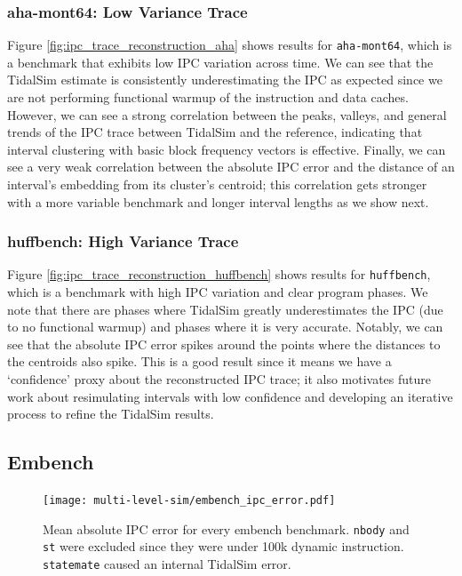 \documentclass[sigplan,nonacm,10pt]{acmart}
\begin{document}
\subsubsection{aha-mont64: Low Variance Trace}

Figure \ref{fig:ipc_trace_reconstruction_aha} shows results for \texttt{aha-mont64}, which is a benchmark that exhibits low IPC variation across time.
We can see that the TidalSim estimate is consistently underestimating the IPC as expected since we are not performing functional warmup of the instruction and data caches.
However, we can see a strong correlation between the peaks, valleys, and general trends of the IPC trace between TidalSim and the reference, indicating that interval clustering with basic block frequency vectors is effective.
Finally, we can see a very weak correlation between the absolute IPC error and the distance of an interval's embedding from its cluster's centroid; this correlation gets stronger with a more variable benchmark and longer interval lengths as we show next.

\subsubsection{huffbench: High Variance Trace}

Figure \ref{fig:ipc_trace_reconstruction_huffbench} shows results for \texttt{huffbench}, which is a benchmark with high IPC variation and clear program phases.
We note that there are phases where TidalSim greatly underestimates the IPC (due to no functional warmup) and phases where it is very accurate.
Notably, we can see that the absolute IPC error spikes around the points where the distances to the centroids also spike.
This is a good result since it means we have a `confidence' proxy about the reconstructed IPC trace; it also motivates future work about resimulating intervals with low confidence and developing an iterative process to refine the TidalSim results.

\subsection{Embench}

\begin{figure}
  \texttt{[image: multi-level-sim/embench\_ipc\_error.pdf]}
  \caption{Mean absolute IPC error for every embench benchmark. \texttt{nbody} and \texttt{st} were excluded since they were under 100k dynamic instruction. \texttt{statemate} caused an internal TidalSim error.}
  \label{fig:embench_ipc_error}
\end{figure}
\end{document}

